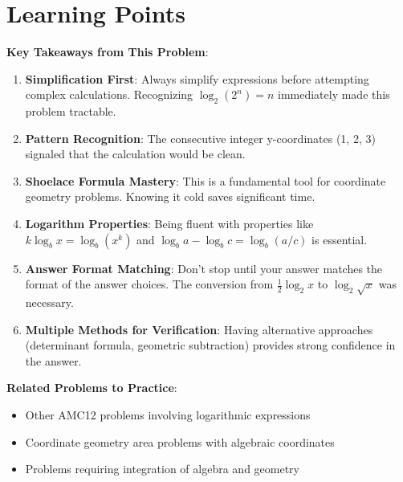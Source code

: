 \documentclass[12pt]{article}
\begin{document}
\section*{Learning Points}

\textbf{Key Takeaways from This Problem}:

\begin{enumerate}
    \item \textbf{Simplification First}: Always simplify expressions before attempting complex calculations. Recognizing $\log_2(2^n) = n$ immediately made this problem tractable.
    
    \item \textbf{Pattern Recognition}: The consecutive integer y-coordinates (1, 2, 3) signaled that the calculation would be clean.
    
    \item \textbf{Shoelace Formula Mastery}: This is a fundamental tool for coordinate geometry problems. Knowing it cold saves significant time.
    
    \item \textbf{Logarithm Properties}: Being fluent with properties like $k\log_b x = \log_b(x^k)$ and $\log_b a - \log_b c = \log_b(a/c)$ is essential.
    
    \item \textbf{Answer Format Matching}: Don't stop until your answer matches the format of the answer choices. The conversion from $\frac{1}{2}\log_2 x$ to $\log_2\sqrt{x}$ was necessary.
    
    \item \textbf{Multiple Methods for Verification}: Having alternative approaches (determinant formula, geometric subtraction) provides strong confidence in the answer.
\end{enumerate}

\vspace{0.5cm}

\textbf{Related Problems to Practice}:
\begin{itemize}
    \item Other AMC12 problems involving logarithmic expressions
    \item Coordinate geometry area problems with algebraic coordinates
    \item Problems requiring integration of algebra and geometry
\end{itemize}
\end{document}
